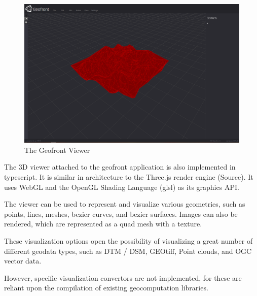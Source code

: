 \begin{figure}
  \centering
  \graphicspath{ {../../assets/images/implementation/} }
  \includegraphics[width=\linewidth]{viewer.png}
  \caption[Geofront viewer]{The Geofront Viewer}
  \label{fig:geofront-viewer}
\end{figure}

The 3D viewer attached to the geofront application is also implemented in typescript. 
It is similar in architecture to the Three.js render engine (Source).
It uses WebGL and the OpenGL Shading Language (glsl) as its graphics API. 

The viewer can be used to represent and visualize various geometries, such as points, lines, meshes, bezier curves, and bezier surfaces.
Images can also be rendered, which are represented as a quad mesh with a texture. 

These visualization options open the possibility of visualizing a great number of different geodata types, such as DTM / DSM, GEOtiff, Point clouds, and OGC vector data. 

However, specific visualization convertors are not implemented, for these are reliant upon the compilation of existing geocomputation libraries. 

